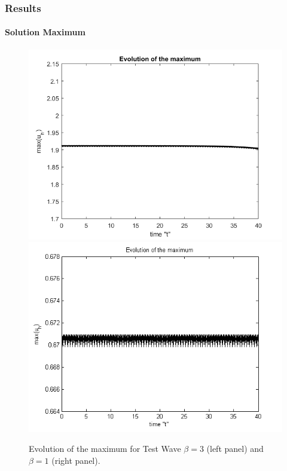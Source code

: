 \documentclass{beamer}
\begin{document}
\begin{frame}
\frametitle{Results}
\framesubtitle{Solution Maximum}
\begin{figure}[ht]
	\centering
	\begin{minipage}[b]{0.4\linewidth}
		\includegraphics[width=\linewidth]{figures/EvolutionOfMaximum_bt3_t40.png}
	\end{minipage}	
	\begin{minipage}[b]{0.4\linewidth}
		 \includegraphics[width=\linewidth]{figures/EvolutionOfMaximum_bt1_t40.png}
	\end{minipage}

Evolution of the maximum for Test Wave $\beta =3$ (left panel) and $\beta=1$ (right panel).
\end{figure}

\end{frame}
\end{document}

